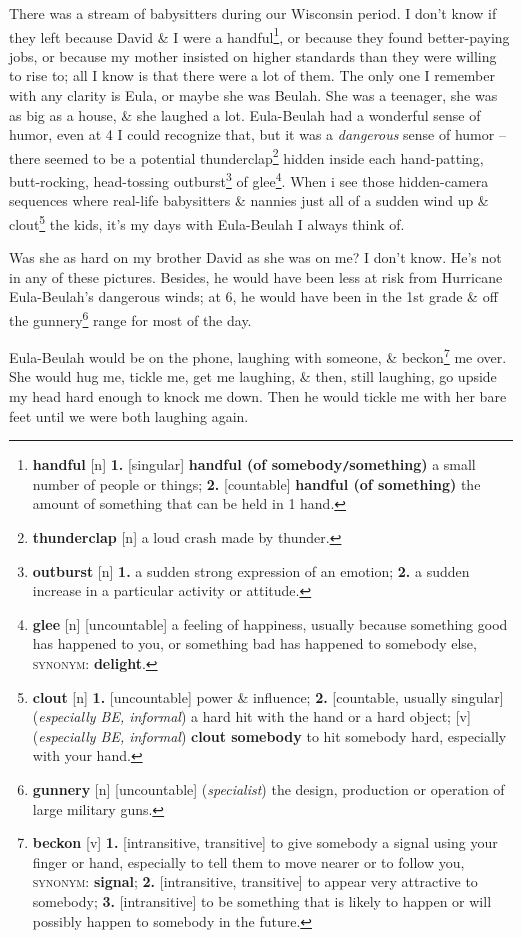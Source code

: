\documentclass[oneside]{book}
\numberwithin{equation}{section}
\begin{document}
There was a stream of babysitters during our Wisconsin period. I don't know if they left because David \& I were a handful\footnote{\textbf{handful} [n] \textbf{1.} [singular] \textbf{handful (of somebody\texttt{/}something)} a small number of people or things; \textbf{2.} [countable] \textbf{handful (of something)} the amount of something that can be held in 1 hand.}, or because they found better-paying jobs, or because my mother insisted on higher standards than they were willing to rise to; all I know is that there were a lot of them. The only one I remember with any clarity is Eula, or maybe she was Beulah. She was a teenager, she was as big as a house, \& she laughed a lot. Eula-Beulah had a wonderful sense of humor, even at 4 I could recognize that, but it was a \textit{dangerous} sense of humor -- there seemed to be a potential thunderclap\footnote{\textbf{thunderclap} [n] a loud crash made by thunder.} hidden inside each hand-patting, butt-rocking, head-tossing outburst\footnote{\textbf{outburst} [n] \textbf{1.} a sudden strong expression of an emotion; \textbf{2.} a sudden increase in a particular activity or attitude.} of glee\footnote{\textbf{glee} [n] [uncountable] a feeling of happiness, usually because something good has happened to you, or something bad has happened to somebody else, \textsc{synonym}: \textbf{delight}.}. When i see those hidden-camera sequences where real-life babysitters \& nannies just all of a sudden wind up \& clout\footnote{\textbf{clout} [n] \textbf{1.} [uncountable] power \& influence; \textbf{2.} [countable, usually singular] (\textit{especially BE, informal}) a hard hit with the hand or a hard object; [v] (\textit{especially BE, informal}) \textbf{clout somebody} to hit somebody hard, especially with your hand.} the kids, it's my days with Eula-Beulah I always think of.

Was she as hard on my brother David as she was on me? I don't know. He's not in any of these pictures. Besides, he would have been less at risk from Hurricane Eula-Beulah's dangerous winds; at 6, he would have been in the 1st grade \& off the gunnery\footnote{\textbf{gunnery} [n] [uncountable] (\textit{specialist}) the design, production or operation of large military guns.} range for most of the day.

Eula-Beulah would be on the phone, laughing with someone, \& beckon\footnote{\textbf{beckon} [v] \textbf{1.} [intransitive, transitive] to give somebody a signal using your finger or hand, especially to tell them to move nearer or to follow you, \textsc{synonym}: \textbf{signal}; \textbf{2.} [intransitive, transitive] to appear very attractive to somebody; \textbf{3.} [intransitive] to be something that is likely to happen or will possibly happen to somebody in the future.} me over. She would hug me, tickle me, get me laughing, \& then, still laughing, go upside my head hard enough to knock me down. Then he would tickle me with her bare feet until we were both laughing again.
\end{document}
